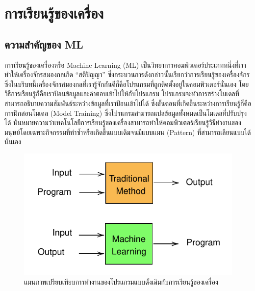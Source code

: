 

\chapter{การเรียนรู้ของเครื่อง}
\label{ch:ml}

\section{ความสำคัญของ ML}

การเรียนรู้ของเครื่องหรือ Machine Learning (ML) เป็นวิทยาการคอมพิวเตอร์ประเภทหนึ่งที่เราทำให้เครื่องจักรสมองกลเกิด \enquote{สติปัญญา} 
ซึ่งกระบวนการดังกล่าวนั้นเรียกว่าการเรียนรู้ของเครื่องจักร ซึ่งในบริบทนี้เครื่องจักรสมองกลที่เรารู้จักกันดีก็คือโปรแกรมที่ถูกติดตั้งอยู่ในคอมพิวเตอร์นั่นเอง
โดยวิธีการเรียนรู้ก็คือเราป้อนข้อมูลและคำตอบเข้าไปให้กับโปรแกรม โปรแกรมจะทำการสร้างโมเดลที่สามารถอธิบายความสัมพันธ์ระหว่างข้อมูลที่เราป้อนเข้าไปได้ 
ซึ่งขั้นตอนที่เกิดขึ้นระหว่างการเรียนรู้ก็คือการฝึกสอนโมเดล (Model Training) ซึ่งโปรแกรมสามารถแปลข้อมูลทั้งหมดเป็นโมเดลที่ปรับปรุงได้ 
นั่นหมายความว่าเทคโนโลยีการเรียนรู้ของเครื่องสามารถทำให้คอมพิวเตอร์เรียนรู้วิธีทำงานของมนุษย์โดยเฉพาะกิจกรรมที่ทำซ้ำหรือเกิดขึ้นแบบเดิมจนมีแบบแผน 
(Pattern) ที่สามารถเลียนแบบได้นั่นเอง 

\begin{figure}[!htp]
    \centering
    \includegraphics[scale=1]{fig/ch1-ML-concept.pdf}
    \caption{แผนภาพเปรียบเทียบการทำงานของโปรแกรมแบบดั้งเดิมกับการเรียนรู้ของเครื่อง}
    \label{fig:ml_paradigm}
\end{figure}

